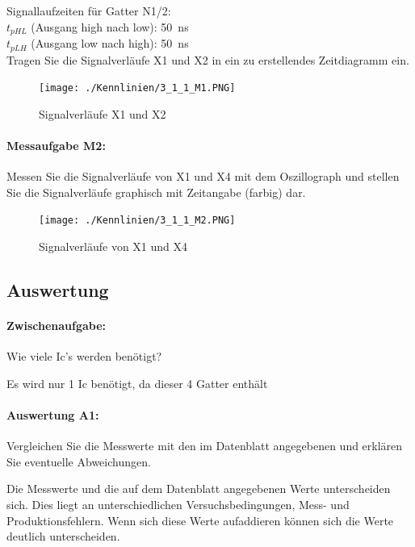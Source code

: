 \documentclass[a4paper,titlepage,parskip]{scrreprt}
\begin{document}
          Signallaufzeiten für Gatter N1/2:\\
          $t_{pHL}$ (Ausgang high nach low): \SI{50}{\nano\second}\\
          $t_{pLH}$ (Ausgang low nach high): \SI{50}{\nano\second}\\

          Tragen Sie die Signalverläufe X1 und X2 in ein zu erstellendes Zeitdiagramm ein.

        \begin{figure}[!htbp]
              \begin{center}
                  \texttt{[image: ./Kennlinien/3\_1\_1\_M1.PNG]}
              \end{center}
              \caption{Signalverläufe X1 und X2}
          \end{figure}

        \paragraph{Messaufgabe M2:} Messen Sie die Signalverläufe von X1 und X4 mit dem Oszillograph und stellen Sie die
          Signalverläufe graphisch mit Zeitangabe (farbig) dar.

        \begin{figure}[!htbp]
            \begin{center}
                \texttt{[image: ./Kennlinien/3\_1\_1\_M2.PNG]}
            \end{center}
            \caption{Signalverläufe von X1 und X4}
        \end{figure}
      \subsection{Auswertung}
        \paragraph{Zwischenaufgabe:} Wie viele Ic's werden benötigt?
        
            Es wird nur 1 Ic benötigt, da dieser 4 Gatter enthält
        
        \paragraph{Auswertung A1:} Vergleichen Sie die Messwerte mit den im Datenblatt angegebenen und erklären Sie
        eventuelle Abweichungen.

          Die Messwerte und die auf dem Datenblatt angegebenen Werte unterscheiden sich. Dies liegt an unterschiedlichen Versuchsbedingungen, Mess- und Produktionsfehlern. Wenn sich diese Werte aufaddieren können sich die Werte deutlich unterscheiden.
\end{document}
